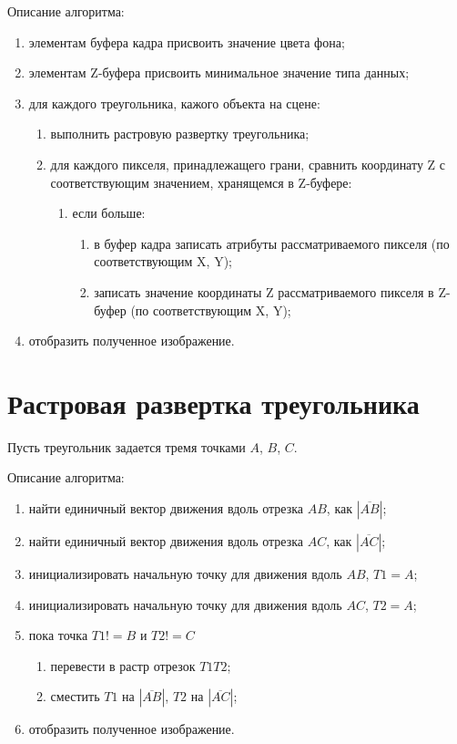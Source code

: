 \documentclass[12pt]{report}
\begin{document}
	Описание алгоритма:
	\begin{enumerate}
		\item элементам буфера кадра присвоить значение цвета фона;
		\item элементам Z-буфера присвоить минимальное значение типа данных;
		\item для каждого треугольника, кажого объекта на сцене:
		\begin{enumerate}
			\item выполнить растровую развертку треугольника;
			\item для каждого пикселя, принадлежащего грани, сравнить координату Z с соответствующим значением, хранящемся в Z-буфере:
			\begin{enumerate}
				\item если больше: 
				\begin{enumerate}
					\item в буфер кадра записать атрибуты рассматриваемого пикселя (по соответствующим X, Y);
					\item записать значение координаты Z рассматриваемого пикселя в Z-буфер (по соответствующим X, Y);
				\end{enumerate}	
			\end{enumerate}
		\end{enumerate}
		\item отобразить полученное изображение.
	\end{enumerate}

	\section{Растровая развертка треугольника}
	
	Пусть треугольник задается тремя точками $A$, $B$, $C$.
	
	Описание алгоритма:
	\begin{enumerate}
		\item найти единичный вектор движения вдоль отрезка $AB$, как $|\overline{AB}|$;
		\item найти единичный вектор движения вдоль отрезка $AC$, как $|\overline{AC}|$;
		\item инициализировать начальную точку для движения вдоль $AB$, $T1 = A$;
		\item инициализировать начальную точку для движения вдоль $AC$, $T2 = A$;
		\item пока точка $T1 != B$ и $T2 != C$
		\begin{enumerate}
			\item перевести в растр отрезок $T1T2$;
			\item сместить $T1$ на $|\overline{AB}|$, $T2$ на $|\overline{AC}|$;
		\end{enumerate}
		\item отобразить полученное изображение.
	\end{enumerate}
\end{document}
